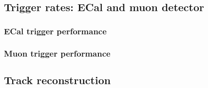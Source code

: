 \subsection{Trigger rates: ECal and muon detector}

\subsubsection{ECal trigger performance}


\subsubsection{Muon trigger performance}

\subsection{Track reconstruction}




